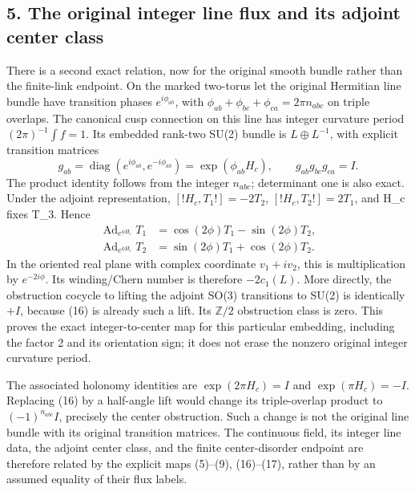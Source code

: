 \documentclass[
  11pt,
]{article}
\begin{document}
\subsection{5. The original integer line flux and its adjoint center
class}\label{magnetic-part-7-the-original-integer-line-flux-and-its-adjoint-center-class}

There is a second exact relation, now for the original smooth bundle
rather than the finite-link endpoint. On the marked two-torus let the
original Hermitian line bundle have transition phases
\(e^{i\phi_{ab}}\), with \(\phi_{ab}+\phi_{bc}+\phi_{ca}=2\pi n_{abc}\)
on triple overlaps. The canonical cusp connection on this line has
integer curvature period \((2\pi)^{-1}\int f=1\). Its embedded rank-two
SU(2) bundle is \(L\oplus L^{-1}\), with explicit transition matrices \[
 g_{ab}=\operatorname{diag}(e^{i\phi_{ab}},e^{-i\phi_{ab}})
        =\exp(\phi_{ab}H_c),\qquad g_{ab}g_{bc}g_{ca}=I.
\tag{16}
\] The product identity follows from the integer \(n_{abc}\);
determinant one is also exact. Under the adjoint representation,
\([!H_c,T_1!]=-2T_2\), \([!H_c,T_2!]=2T_1\), and H\_c fixes T\_3. Hence
\[
 \begin{split}
 \operatorname{Ad}_{e^{\phi H_c}}T_1
   &=\cos(2\phi)T_1-\sin(2\phi)T_2,\\
 \operatorname{Ad}_{e^{\phi H_c}}T_2
   &=\sin(2\phi)T_1+\cos(2\phi)T_2.
 \end{split}
\tag{17}
\] In the oriented real plane with complex coordinate \(v_1+iv_2\), this
is multiplication by \(e^{-2i\phi}\). Its winding/Chern number is
therefore \(-2c_1(L)\). More directly, the obstruction cocycle to
lifting the adjoint SO(3) transitions to SU(2) is identically \(+I\),
because (16) is already such a lift. Its \(\mathbb Z/2\) obstruction
class is zero. This proves the exact integer-to-center map for this
particular embedding, including the factor 2 and its orientation sign;
it does not erase the nonzero original integer curvature period.

The associated holonomy identities are \(\exp(2\pi H_c)=I\) and
\(\exp(\pi H_c)=-I\). Replacing (16) by a half-angle lift would change
its triple-overlap product to \((-1)^{n_{abc}}I\), precisely the center
obstruction. Such a change is not the original line bundle with its
original transition matrices. The continuous field, its integer line
data, the adjoint center class, and the finite center-disorder endpoint
are therefore related by the explicit maps (5)--(9), (16)--(17), rather
than by an assumed equality of their flux labels.
\end{document}
